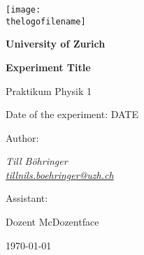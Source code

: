 \begin{titlepage}
    \setlength{\headheight}{0cm}
	\texttt{[image: \\thelogofilename]}\par\vspace{1cm}
	
	\centering
	
	{\bfseries\LARGE University of Zurich\par}
	\vspace{0.7cm}
	
	{\Huge\bfseries Experiment Title\par}
	\vspace{0.7cm}

	{\LARGE Praktikum Physik 1 \par Date of the experiment: DATE \par }
	\vfill

    {\large Author:\par\vspace{0.2cm}}
	{\Large\itshape Till Böhringer\\ \href{mailto:tillnils.boehringer@uzh.ch}{tillnils.boehringer@uzh.ch} \par}
	\vfill

	
	{\large Assistant:\par\vspace{0.2cm}}
	{\Large Dozent McDozentface}
	\vfill
	\vfill

	{\large \today\par}
\end{titlepage}
\restoregeometry %